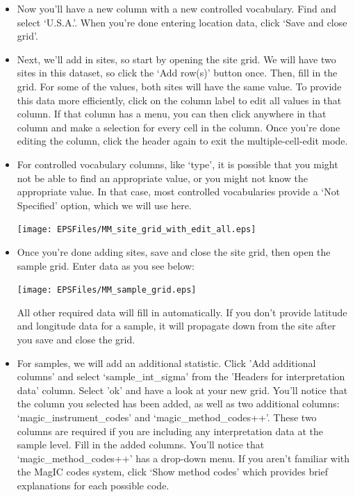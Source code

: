 \documentclass[11pt]{book}
\begin{document}
{\begin{itemize}
    \texttt{[image: EPSFiles/MM\_add\_location\_headers.eps]}

  \item Now you'll have a new column with a new controlled vocabulary.  Find and select `U.S.A.'.  When you're done entering location data, click `Save and close grid'.

  \item Next, we'll add in sites, so start by opening the site grid.  We will have two sites in this dataset, so click the `Add row(s)' button once.  Then, fill in the grid.  For some of the values, both sites will have the same value.  To provide this data more efficiently, click on the column label to edit all values in that column.  If that column has a menu, you can then click anywhere in that column and make a selection for every cell in the column. Once you're done editing the column, click the header again to exit the multiple-cell-edit mode.
  \item For controlled vocabulary columns, like `type', it is possible that you might not be able to find an appropriate value, or you might not know the appropriate value.  In that case, most controlled vocabularies provide a `Not Specified' option, which we will use here.

    \texttt{[image: EPSFiles/MM\_site\_grid\_with\_edit\_all.eps]}

  \item Once you're done adding sites, save and close the site grid, then open the sample grid.
    Enter data as you see below:

    \texttt{[image: EPSFiles/MM\_sample\_grid.eps]}

    All other required data will fill in automatically.  If you don't provide latitude and longitude data for a sample, it will propagate down from the site after you save and close the grid.

  \item For samples, we will add an additional statistic.  Click 'Add additional columns' and select `sample\_int\_sigma' from the 'Headers for interpretation data' column.  Select 'ok' and have a look at your new grid.  You'll notice that the column you selected has been added, as well as two additional columns: `magic\_instrument\_codes' and `magic\_method\_codes++'.  These two columns are required if you are including any interpretation data at the sample level.  Fill in the added columns.  You'll notice that `magic\_method\_codes++' has a drop-down menu.  If you aren't familiar with the MagIC codes system, click `Show method codes' which provides brief explanations for each possible code.


\end{itemize}}
\end{document}
